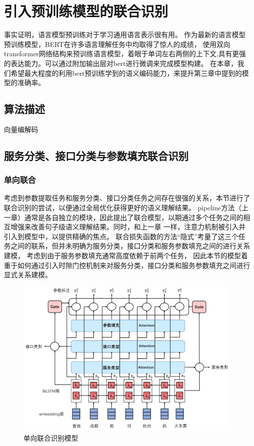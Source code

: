 \chapter{引入预训练模型的联合识别}

事实证明，语言模型预训练对于学习通用语言表示很有用。 作为最新的语言模型预训练模型，BERT在许多语言理解任务中均取得了惊人的成绩，
使用双向transformer网络结构来预训练语言模型，着眼于单词左右两侧的上下文,具有更强的表达能力。可以通过附加输出层对bert进行微调来完成模型构建。
在本章，我们希望最大程度的利用bert预训练学到的语义编码能力，来提升第三章中提到的模型的准确率。

\section{算法描述}
向量编解码

\section{服务分类、接口分类与参数填充联合识别}
\subsection{单向联合}
考虑到参数提取任务和服务分类、接口分类任务之间存在很强的关系，本节进行了联合识别的尝试，以便通过全局优化获得更好的语义理解结果。
pipeline方法（上一章）通常是各自独立的模块，因此提出了联合模型，以期通过多个任务之间的相互增强来改善句子级语义理解结果。同时，和上一章
一样，注意力机制被引入并引入到模型中，以提供精确的焦点。
联合损失函数的方法“隐式”考量了这三个任务之间的联系，但并未明确为服务分类，接口分类和服务参数填充之间的进行关系建模，
考虑到由于服务参数填充通常高度依赖于前两个任务，
因此本节的模型着重于如何通过引入时隙门控机制来对服务分类，接口分类和服务参数填充之间进行显式关系建模。

\begin{figure}[htbp]
    \centering
    \includegraphics[width=17cm]{./images/lianhe.jpg}
    \caption{单向联合识别模型}
    \label{fig:lianhe1}
  \end{figure}

